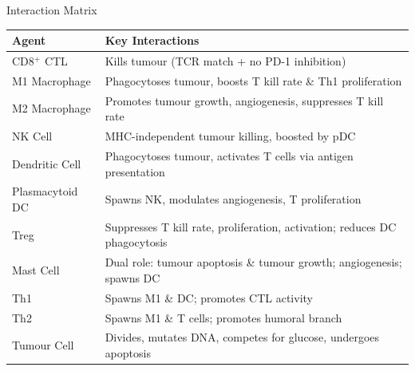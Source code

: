 \documentclass[aspectratio=169,10pt]{beamer}
\begin{document}
\begin{frame}{Interaction Matrix}
  \centering
  \small
  \begin{tabular}{@{}l p{7.5cm}@{}}
    \toprule
    \textbf{Agent} & \textbf{Key Interactions} \\
    \midrule
    CD8$^+$ CTL & Kills tumour (TCR match + no PD-1 inhibition) \\
    M1 Macrophage & Phagocytoses tumour, boosts T kill rate \& Th1 proliferation \\
    M2 Macrophage & Promotes tumour growth, angiogenesis, suppresses T kill rate \\
    NK Cell & MHC-independent tumour killing, boosted by pDC \\
    Dendritic Cell & Phagocytoses tumour, activates T cells via antigen presentation \\
    Plasmacytoid DC & Spawns NK, modulates angiogenesis, T proliferation \\
    Treg & Suppresses T kill rate, proliferation, activation; reduces DC phagocytosis \\
    Mast Cell & Dual role: tumour apoptosis \& tumour growth; angiogenesis; spawns DC \\
    Th1 & Spawns M1 \& DC; promotes CTL activity \\
    Th2 & Spawns M1 \& T cells; promotes humoral branch \\
    Tumour Cell & Divides, mutates DNA, competes for glucose, undergoes apoptosis \\
    \bottomrule
  \end{tabular}
\end{frame}
\end{document}

